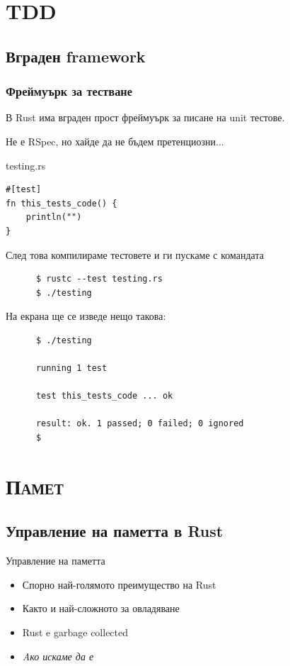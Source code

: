 \documentclass[xcolor=x11names,compress]{beamer}
\renewcommand{\(}{\begin{columns}}
\renewcommand{\)}{\end{columns}}
\newcommand{\<}[1]{\begin{column}{#1}}
\renewcommand{\>}{\end{column}}
\begin{document}
\section{\scshape TDD}
\subsection{Вграден framework}
\begin{frame}[fragile]
  \frametitle{Фреймуърк за тестване}
  В Rust има вграден прост фреймуърк за писане на unit тестове.

  \pause
  Не е RSpec, но хайде да не бъдем претенциозни...

  \pause
  \begin{block}{testing.rs}
    \begin{lstlisting}
#[test]
fn this_tests_code() {
    println("")
}
    \end{lstlisting}
  \end{block}
\end{frame}

\begin{frame}[fragile]
  След това компилираме тестовете и ги пускаме с командата
    \begin{lstlisting}
      $ rustc --test testing.rs
      $ ./testing
    \end{lstlisting}

  \pause\vspace{1cm}
  На екрана ще се изведе нещо такова:
  \begin{lstlisting}
      $ ./testing

      running 1 test

      test this_tests_code ... ok

      result: ok. 1 passed; 0 failed; 0 ignored
      $
  \end{lstlisting}
\end{frame}

\section{\scshape Памет}
\subsection{Управление на паметта в Rust}
\begin{frame}{Управление на паметта}
  \begin{itemize}[<+->]
  \item Спорно най-голямото преимущество на Rust
  \item Както и най-сложното за овладяване
  \item Rust e garbage collected
  \item \emph{Aко искаме да е}
  \end{itemize}
\end{frame}
\end{document}
